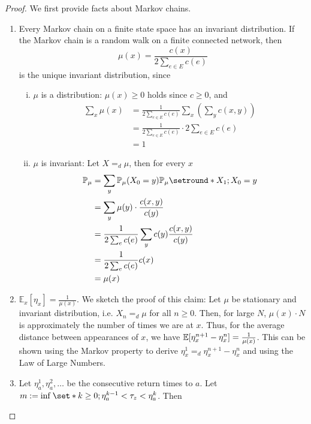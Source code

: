 \begin{proof} We first provide facts about Markov chains.
    \begin{enumerate}
      \item Every Markov chain on a finite state space has an invariant distribution. If the Markov chain is a random walk on a finite connected network, then 
        \[\mu(x)=\frac{c(x)}{2 \sum_{e\in E}c(e)}\]
        is the unique invariant distribution, since 
        \begin{enumerate}[i)]
          \item \(\mu \) is a distribution: \(\mu(x)\geq 0\) holds since $c\geq 0$, and 
            \begin{align*}\sum_x \mu(x) &= \frac{1}{2 \sum_{e\in E} c(e)}\sum_x \left(\sum_y c(x,y)\right) \\
              &= \frac{1}{2 \sum_{e\in E}c(e)} \cdot 2 \sum_{e\in E} c(e) \\
              &=1
            \end{align*}
          \item \(\mu\) is invariant: Let $X=_d \mu$, then for every $x$
            \begin{align*}
              \mathbb{P}_{\mu }&= \sum_y \mathbb{P}_{\mu }(X_0=y) \mathbb{P}_{\mu } \setround*{X_1 ;X_0=y} \\
                               &= \sum_y \mu(y) \cdot \frac{c(x,y)}{c(y)} \\
                               &=\frac{1}{2 \sum_e c(e)} \sum_y c(y) \frac{c(x,y)}{c(y)} \\
                               &=\frac{1}{2 \sum_e c(e)}c(x) \\
                               &= \mu(x)
            \end{align*}
        \end{enumerate}
      \item \(\mathbb{E}_x[\eta_x] = \frac{1}{\mu(x)}\). We sketch the proof of this claim: Let \(\mu \) be stationary and invariant distribution, i.e. \(X_n =_d \mu\) for all $n\geq 0$. Then, for large $N$, $\mu(x)\cdot N$ is approximately the number of times we are at $x$. Thus, for the average distance between appearances of $x$, we have  \(\mathbb{E}[\eta_x^{n+1}-\eta_x^n]=\frac{1}{\mu(x)}\). This can be shown using the Markov property to derive $\eta_x^1=_d \eta_x^{n+1}- \eta_x^n$ and using the Law of Large Numbers. 
      \item Let \(\eta_a^1, \eta_a^2, \dots\) be the consecutive return times to \(a\). Let \(m:=\inf_{} \set*{k\geq 0; \eta_a^{k-1}< \tau_z < \eta_a^k}\). Then

\end{enumerate}
\end{proof}
